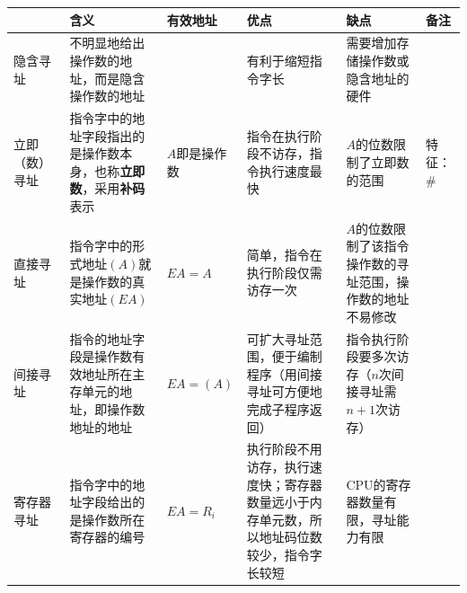 \documentclass[a4paper,12pt]{article}
\begin{document}
    \begin{table}[htbp]
        \centering
        \renewcommand{\arraystretch}{1.5}   %
        \setlength{\tabcolsep}{2pt}         %
        \small
        \begin{tabular}{|
                >{\centering\arraybackslash}m{}|
                >{\centering\arraybackslash}m{}|
                >{\centering\arraybackslash}m{}|
                >{\centering\arraybackslash}m{}|
                >{\centering\arraybackslash}m{}|
                >{\centering\arraybackslash}m{}|}
            \hline
            & \textbf{含义}                                                                     & \textbf{有效地址 }  & \textbf{优点}                                                                            & \textbf{缺点}                     & \textbf{备注}                                                                              \\
            \hline
            隐含寻址    & 不明显地给出操作数的地址，而是隐含操作数的地址                                                         &                 & 有利于缩短指令字长                                                                              & 需要增加存储操作数或隐含地址的硬件               &                                                                                          \\
            \hline
            立即（数）寻址 & 指令字中的地址字段指出的是操作数本身，也称\textbf{立即数}，采用\textbf{补码}表示                               & $A$即是操作数        & 指令在执行阶段不访存，指令执行速度最快 & $A$的位数限制了立即数的范围 & 特征：$\#$ \\
            \hline
            直接寻址    & 指令字中的形式地址$(A)$就是操作数的真实地址$(EA)$                                                  & $EA = A$        & 简单，指令在执行阶段仅需访存一次                                                                       & $A$的位数限制了该指令操作数的寻址范围，操作数的地址不易修改 & \\
            \hline
            间接寻址    & 指令的地址字段是操作数有效地址所在主存单元的地址，即操作数地址的地址                                              & $EA = (A)$      & 可扩大寻址范围，便于编制程序（用间接寻址可方便地完成子程序返回） & 指令执行阶段要多次访存（$n$次间接寻址需$n+1$次访存）& \\
            \hline
            寄存器寻址   & 指令字中的地址字段给出的是操作数所在寄存器的编号                                                        & $EA = R_i$      & 执行阶段不用访存，执行速度快；寄存器数量远小于内存单元数，所以地址码位数较少，指令字长较短 & CPU的寄存器数量有限，寻址能力有限 & \\

\end{tabular}
\end{table}
\end{document}
